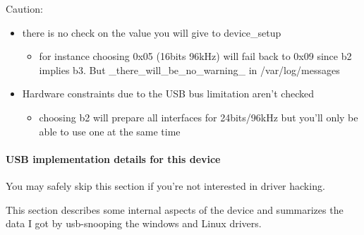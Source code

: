 \documentclass[a4paper,8pt,english]{sphinxmanual}
\begin{document}
Caution:
\begin{itemize}
\item {} 
there is no check on the value you will give to device\_setup
\begin{itemize}
\item {} 
for instance choosing 0x05 (16bits 96kHz) will fail back to 0x09 since
b2 implies b3. But \_there\_will\_be\_no\_warning\_ in /var/log/messages

\end{itemize}

\item {} 
Hardware constraints due to the USB bus limitation aren't checked
\begin{itemize}
\item {} 
choosing b2 will prepare all interfaces for 24bits/96kHz but you'll
only be able to use one at the same time

\end{itemize}

\end{itemize}


\paragraph{USB implementation details for this device}
\label{sound/cards/audiophile-usb:usb-implementation-details-for-this-device}
You may safely skip this section if you're not interested in driver
hacking.

This section describes some internal aspects of the device and summarizes the
data I got by usb-snooping the windows and Linux drivers.
\end{document}
